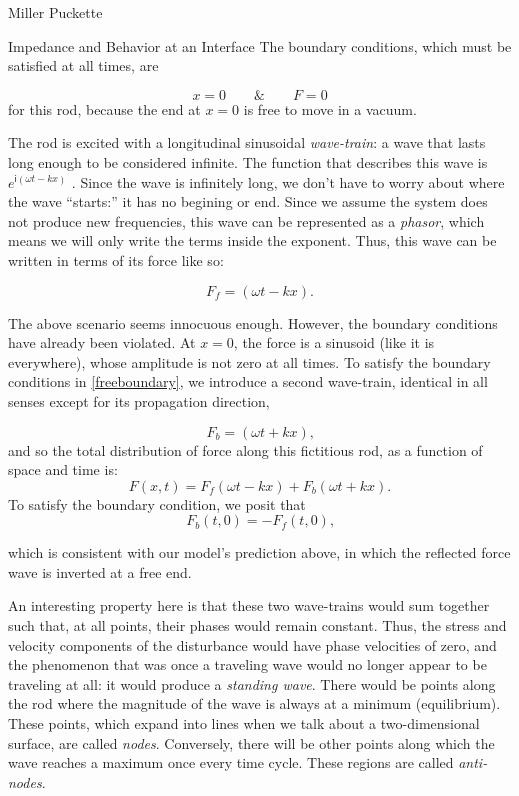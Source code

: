 \documentclass[a4paper,10pt]{report}
\numberwithin{equation}{section}
\begin{document}
\begin{chapter}{Miller Puckette}
\begin{section}{Impedance and Behavior at an Interface}
The boundary conditions, which must be satisfied at all times, are

\begin{equation}
 x = 0 \qquad \text{\&} \qquad F = 0
 \label{freeboundary}
\end{equation}
for this rod, because the end at $x=0$ is free to move in a vacuum.

The rod is excited with a longitudinal sinusoidal \emph{wave-train}: a wave that lasts long enough to be considered infinite. The function that describes this wave is $e^{\mathsf{i}(\omega t - kx)}$ . Since the wave is infinitely long, we don't have to worry about where the wave ``starts:'' it has no begining or end. Since we assume the system does not produce new frequencies, this wave can be represented as a \emph{phasor}, which means we will only write the terms inside the exponent. Thus, this wave can be written in terms of its force like so:

\begin{equation}
F_f = (\omega t - kx) \text{.}
\end{equation}

The above scenario seems innocuous enough. However, the boundary conditions have already been violated. At $x=0$, the force is a sinusoid (like it is everywhere), whose amplitude is not zero at all times. To satisfy the boundary conditions in \eqref{freeboundary}, we introduce a second wave-train, identical in all senses except for its propagation direction,

\begin{equation}
F_b = (\omega t + kx) \text{,}
\end{equation}
and so the total distribution of force along this fictitious rod, as a function of space and time is:
\begin{equation}
F(x, t) = F_f (\omega t - kx) + F_b (\omega t + kx) \text{.}
\end{equation}
To satisfy the boundary condition, we posit that
\begin{equation}
F_b (t, 0) = -F_f (t, 0) \text{,}
\end{equation}

which is consistent with our model's prediction above, in which the reflected force wave is inverted at a free end. \cite[p.~116]{Cremer1973}

An interesting property here is that these two wave-trains would sum together such that, at all points, their phases would remain constant. Thus, the stress and velocity components of the disturbance would have phase velocities of zero, and the phenomenon that was once a traveling wave would no longer appear to be traveling at all: it would produce a \emph{standing wave}. There would be points along the rod where the magnitude of the wave is always at a minimum (equilibrium). These points, which expand into lines when we talk about a two-dimensional surface, are called \emph{nodes}. Conversely, there will be other points along which the wave reaches a maximum once every time cycle. These regions are called \emph{anti-nodes}. 


\end{section}
\end{chapter}
\end{document}

